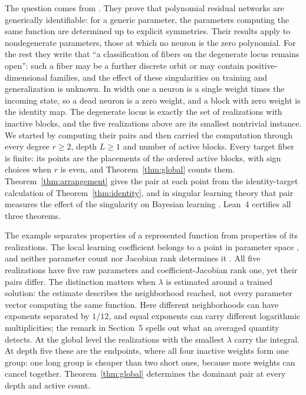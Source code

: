 \documentclass[11pt,letterpaper]{amsart}
\theoremstyle{scplain}
\begin{document}
The question comes from \citet{dahlgren2026}. They prove that polynomial residual networks are generically identifiable: for a generic parameter, the parameters computing the same function are determined up to explicit symmetries. Their results apply to nondegenerate parameters, those at which no neuron is the zero polynomial. For the rest they write that ``a classification of fibers on the degenerate locus remains open'': such a fiber may be a further discrete orbit or may contain positive-dimensional families, and the effect of these singularities on training and generalization is unknown. In width one a neuron is a single weight times the incoming state, so a dead neuron is a zero weight, and a block with zero weight is the identity map. The degenerate locus is exactly the set of realizations with inactive blocks, and the five realizations above are its smallest nontrivial instance. We started by computing their pairs and then carried the computation through every degree $r\ge2$, depth $L\ge1$ and number of active blocks. Every target fiber is finite: its points are the placements of the ordered active blocks, with sign choices when $r$ is even, and Theorem~\ref{thm:global} counts them. Theorem~\ref{thm:arrangement} gives the pair at each point from the identity-target calculation of Theorem~\ref{thm:identity}, and in singular learning theory that pair measures the effect of the singularity on Bayesian learning \citep{watanabe2009}. Lean~4 certifies all three theorems.

The example separates properties of a represented function from properties of its realizations. The local learning coefficient belongs to a point in parameter space \citep{watanabe2009,lau2025}, and neither parameter count nor Jacobian rank determines it \citep{wei2023}. All five realizations have five raw parameters and coefficient-Jacobian rank one, yet their pairs differ. The distinction matters when $\lambda$ is estimated around a trained solution: the estimate describes the neighborhood reached, not every parameter vector computing the same function. Here different neighborhoods can have exponents separated by $1/12$, and equal exponents can carry different logarithmic multiplicities; the remark in Section~5 spells out what an averaged quantity detects. At the global level the realizations with the smallest $\lambda$ carry the integral. At depth five these are the endpoints, where all four inactive weights form one group: one long group is cheaper than two short ones, because more weights can cancel together. Theorem~\ref{thm:global} determines the dominant pair at every depth and active count.
\end{document}
